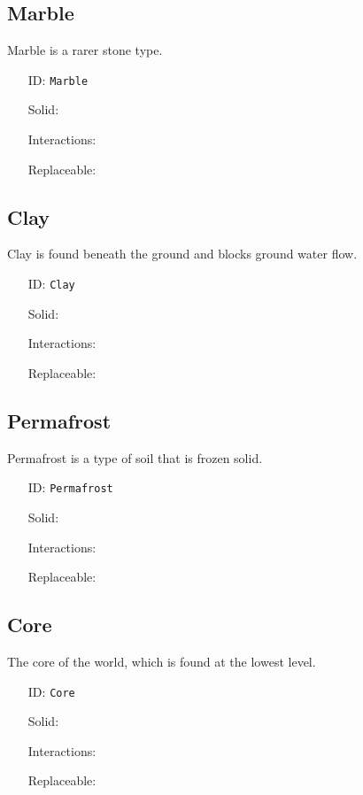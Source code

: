 \subsection{Marble}\label{subsec:blocks_marble}
Marble is a rarer stone type.
\newline
\begin{itemize}[nosep]
    \item[ID:] \texttt{Marble}
    \item[Solid:]  \Checkmark \item[Interactions:]  \XSolidBrush \item[Replaceable:]  \XSolidBrush
\end{itemize}

\subsection{Clay}\label{subsec:blocks_clay}
Clay is found beneath the ground and blocks ground water flow.
\newline
\begin{itemize}[nosep]
    \item[ID:] \texttt{Clay}
    \item[Solid:]  \Checkmark \item[Interactions:]  \XSolidBrush \item[Replaceable:]  \XSolidBrush
\end{itemize}

\subsection{Permafrost}\label{subsec:blocks_permafrost}
Permafrost is a type of soil that is frozen solid.
\newline
\begin{itemize}[nosep]
    \item[ID:] \texttt{Permafrost}
    \item[Solid:]  \Checkmark \item[Interactions:]  \XSolidBrush \item[Replaceable:]  \XSolidBrush
\end{itemize}

\subsection{Core}\label{subsec:blocks_core}
The core of the world, which is found at the lowest level.
\newline
\begin{itemize}[nosep]
    \item[ID:] \texttt{Core}
    \item[Solid:]  \Checkmark \item[Interactions:]  \XSolidBrush \item[Replaceable:]  \XSolidBrush
\end{itemize}

